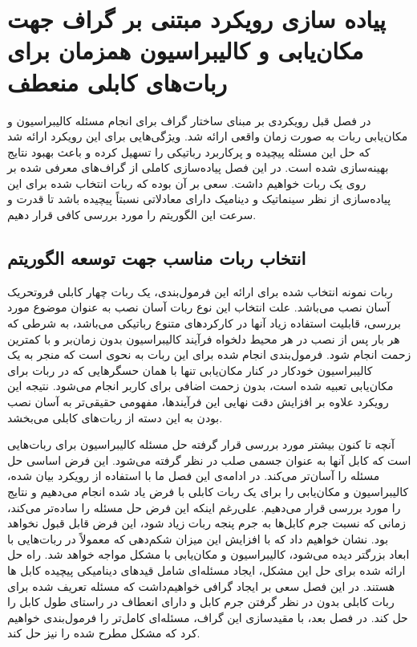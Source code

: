 \chapter{پیاده سازی رویکرد مبتنی بر گراف جهت مکان‌یابی و کالیبراسیون همزمان برای ربات‌های کابلی منعطف}

در فصل قبل رویکردی بر مبنای ساختار گراف برای انجام مسئله کالیبراسیون و مکان‌یابی ربات به صورت زمان واقعی ارائه شد. ویژگی‌هایی برای این رویکرد ارائه شد که حل این مسئله پیچیده و پرکاربرد رباتیکی را تسهیل کرده و باعث بهبود نتایج بهینه‌سازی شده است. در این فصل پیاده‌سازی کاملی از گراف‌های معرفی شده بر روی یک ربات خواهیم داشت. سعی بر آن بوده که ربات انتخاب شده برای این پیاده‌سازی از نظر سینماتیک و دینامیک دارای معادلاتی نسبتاً پیچیده باشد تا قدرت و سرعت این الگوریتم را مورد بررسی کافی قرار دهیم.


\section{انتخاب ربات مناسب جهت توسعه الگوریتم}

ربات نمونه انتخاب شده برای ارائه این فرمول‌بندی، یک ربات چهار کابلی فروتحریک آسان نصب می‌باشد. علت انتخاب این نوع ربات آسان نصب به عنوان موضوع مورد بررسی، قابلیت استفاده زیاد آنها در کارکردهای متنوع رباتیکی می‌باشد، به شرطی که هر بار پس از نصب در هر محیط دلخواه فرآیند کالیبراسیون بدون زمان‌بر و با کمترین زحمت انجام شود. فرمول‌بندی انجام شده برای این ربات به نحوی است که منجر به یک کالیبراسیون خودکار در کنار مکان‌یابی تنها با همان حسگرهایی که در ربات برای مکان‌یابی تعبیه شده است، بدون زحمت اضافی برای کاربر انجام می‌شود. نتیجه این رویکرد علاوه بر افزایش دقت نهایی این فرآیندها، مفهومی حقیقی‌تر به آسان نصب بودن به این دسته از ربات‌های کابلی می‌بخشد.

آنچه تا کنون بیشتر مورد بررسی قرار گرفته حل مسئله کالیبراسیون برای ربات‌هایی است که کابل آنها به عنوان جسمی صلب در نظر گرفته می‌شود. این فرض اساسی حل مسئله را آسان‌تر می‌کند. در ادامه‌ی این فصل ما با استفاده از رویکرد بیان شده، کالیبراسیون و مکان‌یابی را برای یک ربات کابلی با فرض یاد شده انجام می‌دهیم و نتایج را مورد بررسی قرار می‌دهیم. علی‌رغم اینکه این فرض حل مسئله را ساده‌تر می‌کند، زمانی که نسبت جرم کابل‌ها به جرم پنجه ربات زیاد شود، این فرض قابل قبول نخواهد بود. نشان خواهیم داد که با افزایش این میزان شکم‌دهی که معمولاً در ربات‌هایی با ابعاد بزرگتر دیده می‌شود، کالیبراسیون و مکان‌یابی با مشکل مواجه خواهد شد. راه حل ارائه شده برای حل این مشکل، ایجاد مسئله‌ای شامل قیدهای دینامیکی پیچیده کابل ها هستند. در این فصل سعی بر ایجاد گرافی خواهیم‌داشت که مسئله تعریف شده برای ربات کابلی بدون در نظر گرفتن جرم کابل و دارای انعطاف در راستای طول کابل را حل کند. در فصل بعد، با مقید‌سازی این گراف، مسئله‌ای کامل‌تر  را فرمول‌بندی خواهیم کرد که مشکل مطرح شده را نیز حل کند.


